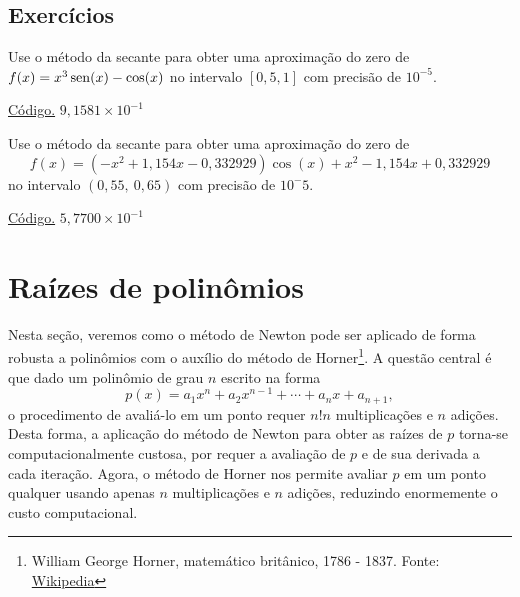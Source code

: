 \subsection*{Exercícios}

\begin{exer}\label{exer:secante_1}
  Use o método da secante para obter uma aproximação do zero de $f(x)=x^3\operatorname{sen}(x)-\cos(x)$ no intervalo $[0,5, 1]$ com precisão de $10^{-5}$.
\end{exer}
\begin{resp}
    \ifisoctave 
  \href{https://github.com/phkonzen/notas/blob/master/src/MatematicaNumerica/cap_eq1d/dados/exer_secante_1/exer_secante_1.m}{Código.} 
  \fi
  $9,1581\times 10^{-1}$
\end{resp}

\begin{exer}\label{exer:secante_multpar}
  Use o método da secante para obter uma aproximação do zero de
  \begin{equation}
    f(x) = (-x^2+1,154x-0,332929)\cos(x) + x^2 - 1,154x + 0,332929
  \end{equation}
no intervalo $(0,55, ~0,65)$ com precisão de $10^-5$.
\end{exer}
\begin{resp}
    \ifisoctave 
  \href{https://github.com/phkonzen/notas/blob/master/src/MatematicaNumerica/cap_eq1d/dados/exer_secante_multpar/exer_secante_multpar.m}{Código.} 
  \fi
  $5,7700\times 10^{-1}$
\end{resp}

\section{Raízes de polinômios}\label{cap_eq1d_sec_raizes}

Nesta seção, veremos como o método de Newton pode ser aplicado de forma robusta a polinômios com o auxílio do método de Horner\footnote{William George Horner, matemático britânico, 1786 - 1837. Fonte: \href{https://en.wikipedia.org/wiki/William_George_Horner}{Wikipedia}}. A questão central é que dado um polinômio de grau $n$ escrito na forma
\begin{equation}
  p(x) = a_{1}x^n + a_{2}x^{n-1} + \cdots + a_nx + a_{n+1},
\end{equation}
o procedimento de avaliá-lo em um ponto requer $n!n$ multiplicações e $n$ adições. Desta forma, a aplicação do método de Newton para obter as raízes de $p$ torna-se computacionalmente custosa, por requer a avaliação de $p$ e de sua derivada a cada iteração. Agora, o método de Horner nos permite avaliar $p$ em um ponto qualquer usando apenas $n$ multiplicações e $n$ adições, reduzindo enormemente o custo computacional.

